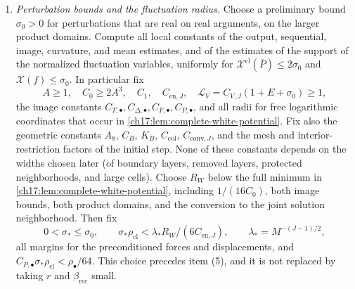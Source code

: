 \begin{theorem}
\begin{enumerate}[label=(\arabic*)]
\item \emph{Perturbation bounds and the fluctuation radius.} Choose a preliminary bound $\sigma_0>0$ for perturbations that are real on real arguments, on the larger product domains. Compute all local constants of the output, sequential, image, curvature, and mean estimates, and of the estimates of the support of the normalized fluctuation variables, uniformly for $\mathcal X^{\mathrm{cl}}(\overline P)\le2\sigma_0$ and $\mathcal X(f)\le\sigma_0$. In particular fix
\[
 A\ge1,\quad C_0\ge2A^3,\quad C_1,\quad C_{\mathrm{en},J},\quad \mathcal L_V=C_{V,J}(1+E+\sigma_0)\ge1,
\]
the image constants $C_{T,\bullet},C_{\Delta,\bullet},C_{F,\bullet},C_{P,\bullet}$, and all radii for free logarithmic coordinates that occur in \cref{ch17:lem:complete-white-potential}. Fix also the geometric constants $A_8$, $C_B$, $K_B$, $C_{\mathrm{col}}$, $C_{\mathrm{conv},J}$, and the mesh and interior-restriction factors of the initial step. None of these constants depends on the widths chosen later (of boundary layers, removed layers, protected neighborhoods, and large cells). Choose $R_W$ below the full minimum in \cref{ch17:lem:complete-white-potential}, including $1/(16C_0)$, both image bounds, both product domains, and the conversion to the joint solution neighborhood. Then fix
\[
 0<\sigma_*\le\sigma_0,\qquad
 \sigma_*\rho_{\mathrm{cl}}<\lambda_*R_W/(6C_{\mathrm{en},J}),\qquad
 \lambda_*=M^{-(J-1)/2},
\]
all margins for the preconditioned forces and displacements, and $C_{P,\bullet}\sigma_*\rho_{\mathrm{cl}}<\rho_\bullet/64$. This choice precedes item \textup{(5)}, and it is not replaced by taking $r$ and $\beta_{\mathrm{rec}}$ small.


\end{enumerate}
\end{theorem}
